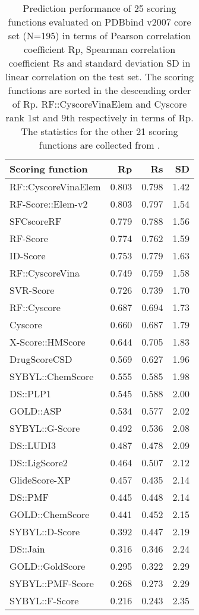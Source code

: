\documentclass[linenumbers]{bmcart}
\begin{document}
\begin{backmatter}
\begin{table}[ht]
\caption{Prediction performance of 25 scoring functions evaluated on PDBbind v2007 core set (N=195) in terms of Pearson correlation coefficient Rp, Spearman correlation coefficient Rs and standard deviation SD in linear correlation on the test set. The scoring functions are sorted in the descending order of Rp. RF::CyscoreVinaElem and Cyscore rank 1st and 9th respectively in terms of Rp. The statistics for the other 21 scoring functions are collected from \cite{1362,1370,1347}.}
\label{tbl:trn1105tst195}
\begin{tabular}{lrrr}
\hline
Scoring function & Rp & Rs & SD\\
\hline
RF::CyscoreVinaElem & 0.803 & 0.798 & 1.42\\
RF-Score::Elem-v2 & 0.803 & 0.797 & 1.54 \\
SFCscoreRF & 0.779 & 0.788 & 1.56\\
RF-Score & 0.774 & 0.762 & 1.59\\
ID-Score & 0.753 & 0.779 & 1.63\\
RF::CyscoreVina & 0.749 & 0.759 & 1.58\\
SVR-Score & 0.726 & 0.739 & 1.70\\
RF::Cyscore & 0.687 & 0.694 & 1.73\\
Cyscore & 0.660 & 0.687 & 1.79\\
X-Score::HMScore & 0.644 & 0.705 & 1.83\\
DrugScoreCSD & 0.569 & 0.627 & 1.96\\
SYBYL::ChemScore & 0.555 & 0.585 & 1.98\\
DS::PLP1 & 0.545 & 0.588 & 2.00\\
GOLD::ASP & 0.534 & 0.577 & 2.02\\
SYBYL::G-Score & 0.492 & 0.536 & 2.08\\
DS::LUDI3 & 0.487 & 0.478 & 2.09\\
DS::LigScore2 & 0.464 & 0.507 & 2.12\\
GlideScore-XP & 0.457 & 0.435 & 2.14\\
DS::PMF & 0.445 & 0.448 & 2.14\\
GOLD::ChemScore & 0.441 & 0.452 & 2.15\\
SYBYL::D-Score & 0.392 & 0.447 & 2.19\\
DS::Jain & 0.316 & 0.346 & 2.24\\
GOLD::GoldScore & 0.295 & 0.322 & 2.29\\
SYBYL::PMF-Score & 0.268 & 0.273 & 2.29\\
SYBYL::F-Score & 0.216 & 0.243 & 2.35\\
\hline
\end{tabular}
\end{table}


\end{backmatter}
\end{document}
